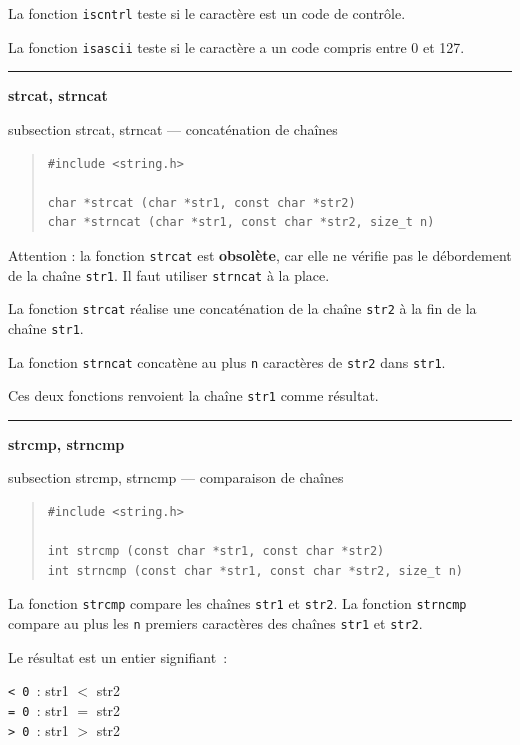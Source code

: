\documentclass [twoside] {report}
\newcommand {\primitive} [1]
    {
	\phantomsection
	{\large \textbf {#1}}
	\addcontentsline {toc} {subsection} {#1}
    }
\newcommand {\separation}
    {
	\vspace {5mm}
	\nopagebreak
	\hrule
    }
\begin{document}
La fonction \texttt {iscntrl} teste si le caractère est un
code de contrôle.

La fonction \texttt {isascii} teste si le caractère a un code
compris entre 0 et 127.


\separation 
\primitive {strcat, strncat} --- concaténation de chaînes

\begin {quote}
\begin {verbatim}
#include <string.h>

char *strcat (char *str1, const char *str2)
char *strncat (char *str1, const char *str2, size_t n)
\end{verbatim}
\end {quote}

Attention : la fonction \texttt {strcat} est \textbf {obsolète}, car elle ne
vérifie pas le débordement de la chaîne \texttt {str1}. Il faut
utiliser \texttt {strncat} à la place.

La fonction \texttt {strcat} réalise une concaténation de la
chaîne \texttt {str2} à la fin de la chaîne \texttt {str1}.

La fonction \texttt {strncat} concatène au plus \texttt {n} caractères
de \texttt {str2} dans \texttt {str1}.

Ces deux fonctions renvoient la chaîne \texttt {str1} comme
résultat.


\separation 
\primitive {strcmp, strncmp} --- comparaison de chaînes

\begin {quote}
\begin {verbatim}
#include <string.h>

int strcmp (const char *str1, const char *str2)
int strncmp (const char *str1, const char *str2, size_t n)
\end{verbatim}
\end {quote}

La fonction \texttt {strcmp} compare les chaînes \texttt {str1} et
\texttt {str2}. La fonction \texttt {strncmp} compare au plus les \texttt {n}
premiers caractères des chaînes \texttt {str1} et \texttt {str2}.

Le résultat est un entier signifiant~:

\texttt {< 0 }: str1 $<$ str2 \\
\texttt {= 0 }: str1 $=$ str2 \\
\texttt {> 0 }: str1 $>$ str2 
\end{document}
